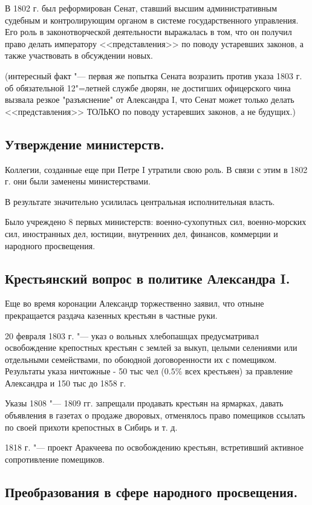 В 1802 г. был реформирован Сенат, ставший высшим административным судебным и контролирующим органом в системе государственного управления. Его роль в законотворческой деятельности выражалась в том, что он получил право делать императору <<представления>> по поводу устаревших законов, а также участвовать в обсуждении новых.

(интересный факт "--- первая же попытка Сената возразить против указа 1803 г. об обязательной 12"=летней службе дворян, не достигших офицерского чина вызвала резкое "разъяснение" от Александра I, что Сенат может только делать <<представления>> ТОЛЬКО по поводу устаревших законов, а не будущих.)

\subsection{Утверждение министерств.}

Коллегии, созданные еще при Петре I утратили свою роль. В связи с этим в 1802 г. они были заменены министерствами.

В результате значительно усилилась центральная исполнительная власть.

Было учреждено 8 первых министерств: военно-сухопутных сил, военно-морских сил, иностранных дел, юстиции, внутренних дел, финансов, коммерции и народного просвещения.

\subsection{Крестьянский вопрос в политике Александра I.}

Еще во время коронации Александр торжественно заявил, что отныне прекращается раздача казенных крестьян в частные руки.

20 февраля 1803 г. "--- указ о вольных хлебопашцах предусматривал освобождение крепостных крестьян с землей за выкуп, целыми селениями или отдельными семействами, по обоюдной договоренности их с помещиком. Результаты указа ничтожные - 50 тыс чел ($0.5\%$ всех крестьяен) за правление Александра и 150 тыс до 1858 г.

Указы 1808 "--- 1809 гг. запрещали продавать крестьян на ярмарках, давать объявления в газетах о продаже дворовых, отменялось право помещиков ссылать по своей прихоти крепостных в Сибирь и т. д.

1818 г. "--- проект Аракчеева по освобождению крестьян, встретивший активное сопротивление помещиков.

\subsection{Преобразования в сфере народного просвещения.}

